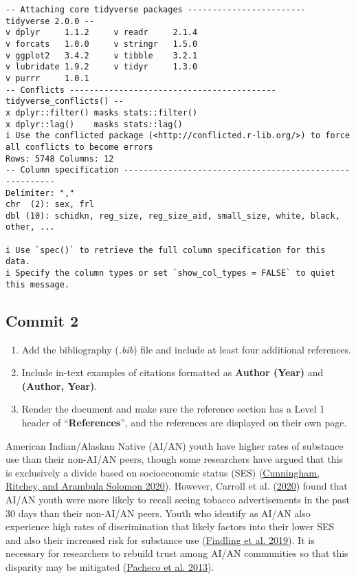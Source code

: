 \documentclass[
  letterpaper,
  DIV=11,
  numbers=noendperiod]{scrartcl}
\begin{document}
\begin{verbatim}
-- Attaching core tidyverse packages ------------------------ tidyverse 2.0.0 --
v dplyr     1.1.2     v readr     2.1.4
v forcats   1.0.0     v stringr   1.5.0
v ggplot2   3.4.2     v tibble    3.2.1
v lubridate 1.9.2     v tidyr     1.3.0
v purrr     1.0.1     
-- Conflicts ------------------------------------------ tidyverse_conflicts() --
x dplyr::filter() masks stats::filter()
x dplyr::lag()    masks stats::lag()
i Use the conflicted package (<http://conflicted.r-lib.org/>) to force all conflicts to become errors
Rows: 5748 Columns: 12
-- Column specification --------------------------------------------------------
Delimiter: ","
chr  (2): sex, frl
dbl (10): schidkn, reg_size, reg_size_aid, small_size, white, black, other, ...

i Use `spec()` to retrieve the full column specification for this data.
i Specify the column types or set `show_col_types = FALSE` to quiet this message.
\end{verbatim}

\hypertarget{commit-2}{%
\subsection{Commit 2}\label{commit-2}}

\begin{enumerate}
\def\labelenumi{\arabic{enumi}.}
\item
  Add the bibliography (\emph{.bib}) file and include at least four
  additional references.
\item
  Include in-text examples of citations formatted as \textbf{Author
  (Year)} and \textbf{(Author, Year)}.
\item
  Render the document and make sure the reference section has a Level 1
  header of ``\textbf{References}'', and the references are displayed on
  their own page.
\end{enumerate}

American Indian/Alaskan Native (AI/AN) youth have higher rates of
substance use than their non-AI/AN peers, though some researchers have
argued that this is exclusively a divide based on socioeconomic status
(SES) (\protect\hyperlink{ref-cunningham2020}{Cunningham, Ritchey, and
Arambula Solomon 2020}). However, Carroll et al.
(\protect\hyperlink{ref-carroll2020}{2020}) found that AI/AN youth were
more likely to recall seeing tobacco advertisements in the past 30 days
than their non-AI/AN peers. Youth who identify as AI/AN also experience
high rates of discrimination that likely factors into their lower SES
and also their increased risk for substance use
(\protect\hyperlink{ref-findling2019}{Findling et al. 2019}). It is
necessary for researchers to rebuild trust among AI/AN communities so
that this disparity may be mitigated
(\protect\hyperlink{ref-pacheco2013}{Pacheco et al. 2013}).
\end{document}
